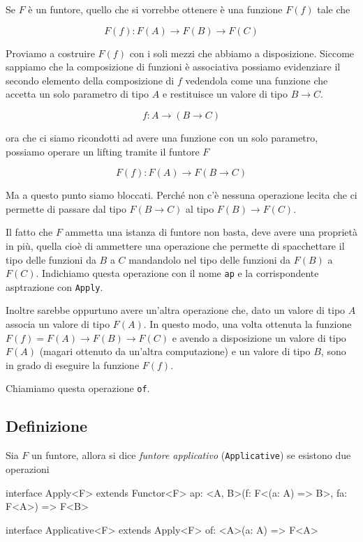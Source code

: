 \documentclass[12pt]{article}
\theoremstyle{definition}
\newenvironment{code}
  {\vspace{0.5cm} \VerbatimEnvironment\begin{typescriptcode}}
  {\end{typescriptcode} \vspace{0.2cm}}
\begin{document}
Se $F$ è un funtore, quello che si vorrebbe ottenere è una funzione $F(f)$ tale che

$$
F(f): F(A) \rightarrow F(B) \rightarrow F(C)
$$

Proviamo a costruire $F(f)$ con i soli mezzi che abbiamo a disposizione.
Siccome sappiamo che la composizione di funzioni è associativa possiamo evidenziare il secondo elemento della composizione di $f$
vedendola come una funzione che accetta un solo parametro di tipo $A$ e restituisce un valore di tipo $B \rightarrow C$.

$$
f: A \rightarrow (B \rightarrow C)
$$

ora che ci siamo ricondotti ad avere una funzione con un solo parametro, possiamo operare un lifting tramite il funtore $F$

$$
F(f): F(A) \rightarrow F(B \rightarrow C)
$$

Ma a questo punto siamo bloccati.
Perché non c'è nessuna operazione lecita che ci permette di passare dal tipo $F(B \rightarrow C)$ al tipo $F(B) \rightarrow F(C)$.

Il fatto che $F$ ammetta una istanza di funtore non basta, deve avere una proprietà in più, quella cioè di ammettere una operazione che permette di
spacchettare il tipo delle funzioni da $B$ a $C$ mandandolo nel tipo delle funzioni da $F(B)$ a $F(C)$.
Indichiamo questa operazione con il nome \texttt{ap} e la corrispondente asptrazione con \texttt{Apply}.

Inoltre sarebbe oppurtuno avere un'altra operazione che, dato un valore di tipo $A$ associa un valore di tipo $F(A)$.
In questo modo, una volta ottenuta la funzione $F(f) = F(A) \rightarrow F(B) \rightarrow F(C)$ e avendo a disposizione un valore di tipo $F(A)$
(magari ottenuto da un'altra computazione) e un valore di tipo $B$, sono in grado di eseguire la funzione $F(f)$.

Chiamiamo questa operazione \texttt{of}.

\subsection{Definizione}

Sia $F$ un funtore, allora si dice \emph{funtore applicativo} (\texttt{Applicative}) se esistono due operazioni

\begin{code}
interface Apply<F> extends Functor<F> {
  ap: <A, B>(f: F<(a: A) => B>, fa: F<A>) => F<B>
}

interface Applicative<F> extends Apply<F> {
  of: <A>(a: A) => F<A>
}
\end{code}
\end{document}
